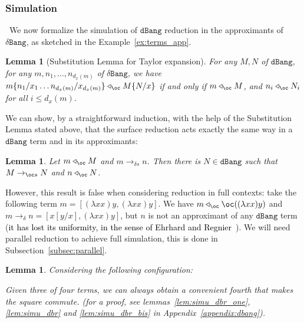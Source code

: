 \documentclass[10pt,a4paper]{article}
\newtheorem{lemma}[theorem]{Lemma}
\newif\iflong
\newcommand{\<}{\langle}
\renewcommand{\>}{\rangle}
\renewcommand{\deg}[2]{d_{#1}(#2)}
\newcommand{\dbang}{\ensuremath{\mathtt{dBang}}}
\newcommand{\dbangres}{\ensuremath{\mathtt{\delta Bang}}}
\newcommand{\todbs}{\to_{\oc s}} %
\newcommand{\todbrs}{\to_{\delta s}} %
\newcommand{\todbrf}{\to_{\delta}} %
\newcommand{\app}{\triangleleft_\oc} %
\newcommand{\fnl}[1]{\textcolor{black}{#1}}
\newif\iflong\longtrue
\newcommand{\nativeemdash}{\ifmmode\text{\textemdash}\else\textemdash\fi}
\begin{document}
\subsubsection{Simulation}\
We now formalize the simulation of $\dbang$ reduction in the approximants of $\dbangres$, as sketched in the
Example~\ref{ex:terms_app}.

\begin{lemma}[Substitution Lemma for Taylor expansion]
	\label{lem:taylor:substitution-lemma}
	For any $M,N$ of $\dbang$, for any $m,n_1,\dots ,n_{\deg xm}$ of $\dbangres$,
	we have $m\{n_1/x_1\dots n_{\deg xm}/x_{\deg xm}\}\app M\{N/x\}$ if and only
	if $m\app M$, and $n_i\app N_i$ for all $i\leq\deg xm$.
\end{lemma}

We can show, by a straightforward induction, with the help of the Substitution
Lemma stated above, that the surface reduction acts
exactly the same way in a \dbang{} term and in its approximants: 

\begin{lemma}\label{lem:simu_dbr_n}
	Let $m\app M$ and $m\todbrs n$. Then there is
	$N\in\dbang$ such that $M\todbs N$ and $n\app N$.
\end{lemma}

However, this result is false when considering reduction in full
contexts: take the following term $m=[(\lambda xx)y,(\lambda xx)y]$.
We have $m\app\oc ((\lambda xx)y)$ and $m\todbrf n= [x[y/x],(\lambda
xx)y]$, but $n$ is not an approximant of any $\dbang$ term (\fnl{it has lost its
uniformity, in the sense of Ehrhard and Regnier~\cite{ER08}}). We will
need parallel reduction to achieve full simulation, this is done in
Subsection~\ref{subsec:parallel}.

\begin{lemma}
\label{lem:square}
Considering the following configuration:
\begin{center}
\end{center}
Given three of four terms,
we can always obtain a convenient fourth that makes the square commute.
\iflong (for a proof, see lemmas~\ref{lem:simu_dbr_one}, \ref{lem:simu_dbr} and \ref{lem:simu_dbr_bis} in
 Appendix~\ref{appendix:dbang}).
\fi
\end{lemma}
\end{document}

